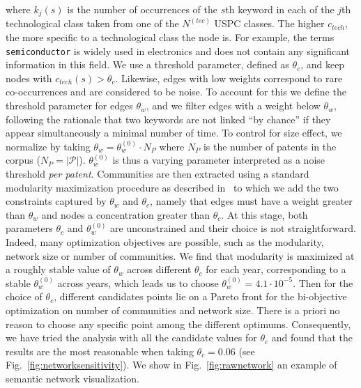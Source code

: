 where $k_j(s)$ is the number of occurrences of the $s$th keyword in each of the $j$th technological class taken from one of the $N^{(tec)}$ USPC classes. The higher $c_{tech}$, the more specific to a technological class the node is. For example, the terms \texttt{semiconductor} is widely used in electronics and does not contain any significant information in this field. We use a threshold parameter, defined as $\theta_c$, and keep nodes with $c_{tech}(s) > \theta_c$. Likewise, edges with low weights correspond to rare co-occurrences and are considered to be noise. To account for this we define the threshold parameter for edges $\theta_w$, and we filter edges with a weight below $\theta_w$, following the rationale that two keywords are not linked ``by chance'' if they appear simultaneously a minimal number of time. To control for size effect, we normalize by taking $\theta_w = \theta_w^{(0)}\cdot N_P$ where $N_P$ is the number of patents in the corpus ($N_P = \left|\mathcal{P} \right|$). $\theta_w^{(0)}$ is thus a varying parameter interpreted as a noise threshold \emph{per patent}. Communities are then extracted using a standard modularity maximization procedure as described in~\cite{clauset2004finding} to which we add the two constraints captured by $\theta_w$ and $\theta_c$, namely that edges must have a weight greater than $\theta_w$ and nodes a concentration greater than $\theta_c$. At this stage, both parameters $\theta_c$ and $\theta_w^{(0)}$ are unconstrained and their choice is not straightforward. Indeed, many optimization objectives are possible, such as the modularity, network size or number of communities. We find that modularity is maximized at a roughly stable value of $\theta_w$ across different $\theta_c$ for each year, corresponding to a stable $\theta_w^{(0)}$ across years, which leads us to choose $\theta_w^{(0)} = 4.1\cdot 10^{-5}$. Then for the choice of $\theta_c$, different candidates points lie on a Pareto front for the bi-objective optimization on number of communities and network size. There is a priori no reason to choose any specific point among the different optimums. Consequently, we have tried the analysis with all the candidate values for $\theta_c$ and found that the results are the most reasonable when taking $\theta_c = 0.06$ (see Fig.~{\ref{fig:networksensitivity}}). We show in Fig.~\ref{fig:rawnetwork} an example of semantic network visualization.


